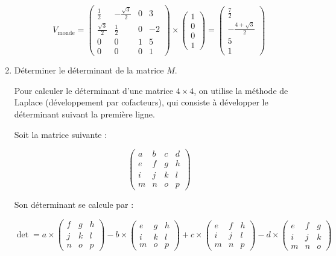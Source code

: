 \documentclass[a4paper,12pt]{article}
\begin{document}
\begin{enumerate}
    \[
    V_{\text{monde}} = 
      \begin{pmatrix}
      \frac{1}{2} & -\frac{\sqrt{3}}{2} & 0 & 3 \\
      \frac{\sqrt{3}}{2} & \frac{1}{2} & 0 & -2 \\
      0 & 0 & 1 & 5 \\
      0 & 0 & 0 & 1
      \end{pmatrix} 
      \times
      \begin{pmatrix} 1 \\ 0 \\ 0 \\ 1 \end{pmatrix}
      =
      \begin{pmatrix} \frac{7}{2} \\ -\frac{4 +\sqrt{3}}{2} \\ 5 \\ 1 \end{pmatrix}
    \] \newline

  \item Déterminer le déterminant de la matrice $M$. \newline

    Pour calculer le déterminant d’une matrice \(4 \times 4\), on utilise la méthode de Laplace (développement par cofacteurs), qui consiste à développer le déterminant suivant la première ligne.

    Soit la matrice suivante :

    \[
    \begin{pmatrix}
    a & b & c & d \\
    e & f & g & h \\
    i & j & k & l \\
    m & n & o & p
    \end{pmatrix}
    \]

    Son déterminant se calcule par :

    \[
    \det =
    a \times 
    \begin{pmatrix}
    f & g & h \\
    j & k & l \\
    n & o & p
    \end{pmatrix}
    - b \times 
    \begin{pmatrix}
    e & g & h \\
    i & k & l \\
    m & o & p
    \end{pmatrix}
    + c \times 
    \begin{pmatrix}
    e & f & h \\
    i & j & l \\
    m & n & p
    \end{pmatrix}
    - d \times 
    \begin{pmatrix}
    e & f & g \\
    i & j & k \\
    m & n & o
    \end{pmatrix}
    \]


\end{enumerate}
\end{document}
